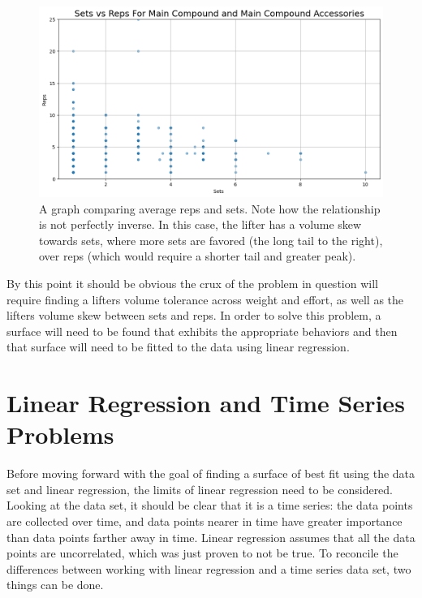 \begin{figure}[h]
    \centering
    \includegraphics[scale=0.55]{images/ch3/SetsVsReps.png}
    \caption{A graph comparing average reps and sets. Note how the relationship is not perfectly inverse. In this case, the lifter has a volume skew towards sets, where more sets are favored (the long tail to the right), over reps (which would require a shorter tail and greater peak).}
    \label{fig:SetsVsReps}
\end{figure}

By this point it should be obvious the crux of the problem in question will require finding a lifters volume tolerance across weight and effort, as well as the lifters volume skew between sets and reps. In order to solve this problem, a surface will need to be found that exhibits the appropriate behaviors and then that surface will need to be fitted to the data using linear regression.

\section{Linear Regression and Time Series Problems}
\label{sec:PotentialSurfaceLinearRegressionAndTimeSeriesProblems}

Before moving forward with the goal of finding a surface of best fit using the data set and linear regression, the limits of linear regression need to be considered. Looking at the data set, it should be clear that it is a time series: the data points are collected over time, and data points nearer in time have greater importance than data points farther away in time. Linear regression assumes that all the data points are uncorrelated, which was just proven to not be true. To reconcile the differences between working with linear regression and a time series data set, two things can be done.

